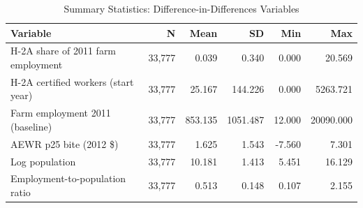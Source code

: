 \begin{table}[htbp]
\centering
\caption{Summary Statistics: Difference-in-Differences Variables}
\label{tab:sumstats}
\begin{tabular}{lrrrrr}
\hline\hline
Variable & N & Mean & SD & Min & Max \\
\hline
H-2A share of 2011 farm employment & 33,777 & 0.039 & 0.340 & 0.000 & 20.569 \\
H-2A certified workers (start year) & 33,777 & 25.167 & 144.226 & 0.000 & 5263.721 \\
Farm employment 2011 (baseline) & 33,777 & 853.135 & 1051.487 & 12.000 & 20090.000 \\
AEWR p25 bite (2012 \$) & 33,777 & 1.625 & 1.543 & -7.560 & 7.301 \\
Log population & 33,777 & 10.181 & 1.413 & 5.451 & 16.129 \\
Employment-to-population ratio & 33,777 & 0.513 & 0.148 & 0.107 & 2.155 \\
\hline\hline
\end{tabular}
\end{table}
